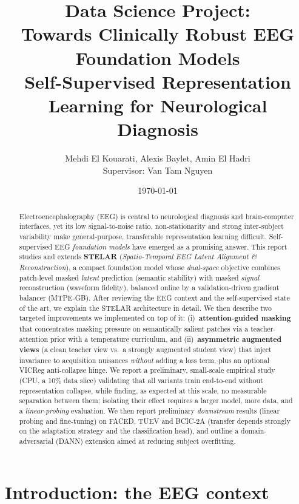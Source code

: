 \documentclass[11pt]{article}
\title{\textbf{Data Science Project}:\\
 Towards Clinically Robust EEG Foundation Models\\[2pt]
\large Self-Supervised Representation Learning for Neurological Diagnosis}
\author{%
  Mehdi El Kouarati, Alexis Baylet, Amin El Hadri\\[2pt]
  \small Supervisor: Van Tam Nguyen\\
  \small \texttt{}
}
\date{\today}
\begin{document}
\maketitle

\begin{abstract}
\noindent
Electroencephalography (EEG) is central to neurological diagnosis and
brain-computer interfaces, yet its low signal-to-noise ratio, non-stationarity
and strong inter-subject variability make general-purpose, transferable
representation learning difficult. Self-supervised EEG \emph{foundation models}
have emerged as a promising answer. This report studies and extends
\textbf{STELAR} (\emph{Spatio-Temporal EEG Latent Alignment \& Reconstruction}),
a compact foundation model whose \emph{dual-space} objective combines patch-level
masked \emph{latent} prediction (semantic stability) with masked \emph{signal}
reconstruction (waveform fidelity), balanced online by a validation-driven
gradient balancer (MTPE-GB). After reviewing the EEG context and the
self-supervised state of the art, we explain the STELAR architecture in detail.
We then describe two targeted improvements we implemented on top of it:
(i)~\textbf{attention-guided masking} that concentrates masking pressure on
semantically salient patches via a teacher-attention prior with a temperature
curriculum, and (ii)~\textbf{asymmetric augmented views} (a clean teacher view
vs.\ a strongly augmented student view) that inject invariance to acquisition
nuisances \emph{without} adding a loss term, plus an optional VICReg anti-collapse
hinge. We report a preliminary, small-scale empirical study (CPU, a 10\% data
slice) validating that all variants train end-to-end without representation
collapse, while finding, as expected at this scale, no measurable separation
between them; isolating their effect requires a larger model, more data, and a
\emph{linear-probing} evaluation. We then report preliminary \emph{downstream}
results (linear probing and fine-tuning) on FACED, TUEV and BCIC-2A (transfer
depends strongly on the adaptation strategy and the classification head), and
outline a domain-adversarial (DANN) extension aimed at reducing subject
overfitting.
\end{abstract}

\section{Introduction: the EEG context}
\label{sec:context}
\end{document}
